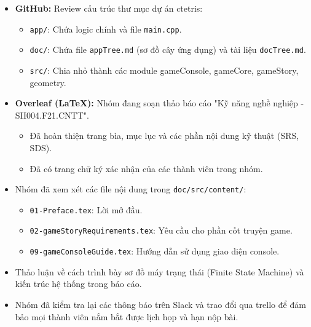 \documentclass[12pt,a4paper]{article}
\begin{document}
\begin{itemize}
    \item \textbf{GitHub:} Review cấu trúc thư mục dự án ctetris:
    \begin{itemize}
        \item \texttt{app/}: Chứa logic chính và file \texttt{main.cpp}.
        \item \texttt{doc/}: Chứa file \texttt{appTree.md} (sơ đồ cây ứng dụng) và tài liệu \texttt{docTree.md}.
        \item \texttt{src/}: Chia nhỏ thành các module gameConsole, gameCore, gameStory, geometry.
    \end{itemize}
    \item \textbf{Overleaf (LaTeX):} Nhóm đang soạn thảo báo cáo "Kỹ năng nghề nghiệp - SII004.F21.CNTT".
    \begin{itemize}
        \item Đã hoàn thiện trang bìa, mục lục và các phần nội dung kỹ thuật (SRS, SDS).
        \item Đã có trang chữ ký xác nhận của các thành viên trong nhóm.
    \end{itemize}
\end{itemize}

\begin{itemize}
    \item Nhóm đã xem xét các file nội dung trong \texttt{doc/src/content/}:
    \begin{itemize}
        \item \texttt{01-Preface.tex}: Lời mở đầu.
        \item \texttt{02-gameStoryRequirements.tex}: Yêu cầu cho phần cốt truyện game.
        \item \texttt{09-gameConsoleGuide.tex}: Hướng dẫn sử dụng giao diện console.
    \end{itemize}
    \item Thảo luận về cách trình bày sơ đồ máy trạng thái (Finite State Machine) và kiến trúc hệ thống trong báo cáo.
\end{itemize}

\begin{itemize}
    \item Nhóm đã kiểm tra lại các thông báo trên Slack và trao đổi qua trello để đảm bảo mọi thành viên nắm bắt được lịch họp và hạn nộp bài.
\end{itemize}
\end{document}
